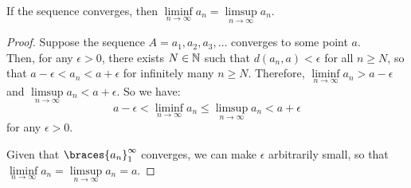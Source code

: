 \begin{answer}
  \newpage
  \begin{claim}
    If the sequence converges, then $\liminf\limits_{n \to \infty}{a_n} = \limsup\limits_{n \to \infty}{a_n}$.

    \begin{proof}
      Suppose the sequence $A = a_1, a_2, a_3, \ldots$ converges to some point $a$. \\
      Then, for any $\epsilon > 0$, there exists $N \in \mathbb{N}$ such that
      $d(a_n, a) < \epsilon$ for all $n \geq N$,
      so that $a - \epsilon < a_n < a + \epsilon$ for infinitely many $n \geq N$.
      Therefore, $\liminf\limits_{n \to \infty}{a_n} > a - \epsilon$ and
      $\limsup\limits_{n \to \infty}{a_n} < a + \epsilon$.
      So we have:
      \[ a - \epsilon < \liminf\limits_{n \to \infty}{a_n} \leq \limsup\limits_{n \to \infty}{a_n} < a + \epsilon \]
      for any $\epsilon > 0$.

      \step
      Given that $\braces{a_n}_1^\infty$ converges, we can make $\epsilon$ arbitrarily
      small, so that $\liminf\limits_{n \to \infty}{a_n} = \limsup\limits_{n \to \infty}{a_n} = a$.
    \end{proof}
  \end{claim}
  
\end{answer}
